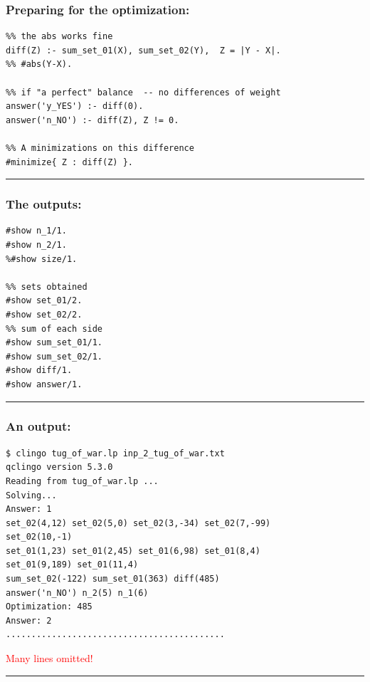 \documentclass{beamer}
\begin{document}


\begin{frame}[fragile]
	\frametitle{Preparing for the optimization:}


{\small
\begin{verbatim}
%% the abs works fine
diff(Z) :- sum_set_01(X), sum_set_02(Y),  Z = |Y - X|. 
%% #abs(Y-X).

%% if "a perfect" balance  -- no differences of weight
answer('y_YES') :- diff(0).
answer('n_NO') :- diff(Z), Z != 0.

%% A minimizations on this difference
#minimize{ Z : diff(Z) }.

\end{verbatim}
}	
\textcolor{red}{\rule{\textwidth}{1.7pt} } 
\end{frame}
\begin{frame}[fragile]
	\frametitle{The outputs:}

{\small
\begin{verbatim}
#show n_1/1. 
#show n_2/1.
%#show size/1.

%% sets obtained
#show set_01/2. 
#show set_02/2.
%% sum of each side 
#show sum_set_01/1.
#show sum_set_02/1.
#show diff/1.
#show answer/1.
\end{verbatim}
}	
\textcolor{red}{\rule{\textwidth}{1.7pt} } 
\end{frame}




\begin{frame} [fragile]
\frametitle{An output:}
	
{\small
\begin{verbatim}
$ clingo tug_of_war.lp inp_2_tug_of_war.txt 
qclingo version 5.3.0
Reading from tug_of_war.lp ...
Solving...
Answer: 1
set_02(4,12) set_02(5,0) set_02(3,-34) set_02(7,-99) 
set_02(10,-1) 
set_01(1,23) set_01(2,45) set_01(6,98) set_01(8,4) 
set_01(9,189) set_01(11,4) 
sum_set_02(-122) sum_set_01(363) diff(485) 
answer('n_NO') n_2(5) n_1(6)
Optimization: 485
Answer: 2
...........................................
\end{verbatim}
\textcolor{red}{Many lines omitted!}\\
\textcolor{red}{\rule{\textwidth}{1.7pt} } 
}	
\end{frame}
\end{document}
